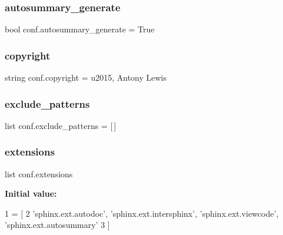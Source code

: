 \subsubsection{\texorpdfstring{autosummary\+\_\+generate}{autosummary\_generate}}
{\footnotesize\ttfamily bool conf.\+autosummary\+\_\+generate = True}

\mbox{\label{namespaceconf_ac8ccf456b321bc9052c0691a173b6925}} 
\subsubsection{\texorpdfstring{copyright}{copyright}}
{\footnotesize\ttfamily string conf.\+copyright = u\textquotesingle{}2015, Antony Lewis\textquotesingle{}}

\mbox{\label{namespaceconf_aa01918cfe75aed3ae059dd96c71c8f08}} 
\subsubsection{\texorpdfstring{exclude\+\_\+patterns}{exclude\_patterns}}
{\footnotesize\ttfamily list conf.\+exclude\+\_\+patterns = \mbox{[}$\,$\mbox{]}}

\mbox{\label{namespaceconf_a540efa67c53e84c1c353c1df2e37e39c}} 
\subsubsection{\texorpdfstring{extensions}{extensions}}
{\footnotesize\ttfamily list conf.\+extensions}

{\bfseries Initial value\+:}
\begin{DoxyCode}
1 =  [
2     \textcolor{stringliteral}{'sphinx.ext.autodoc'}, \textcolor{stringliteral}{'sphinx.ext.intersphinx'}, \textcolor{stringliteral}{'sphinx.ext.viewcode'}, \textcolor{stringliteral}{'sphinx.ext.autosummary'}
3 ]
\end{DoxyCode}
\mbox{\label{namespaceconf_a4a6eed5b599783e721f1407368c0c422}} 
